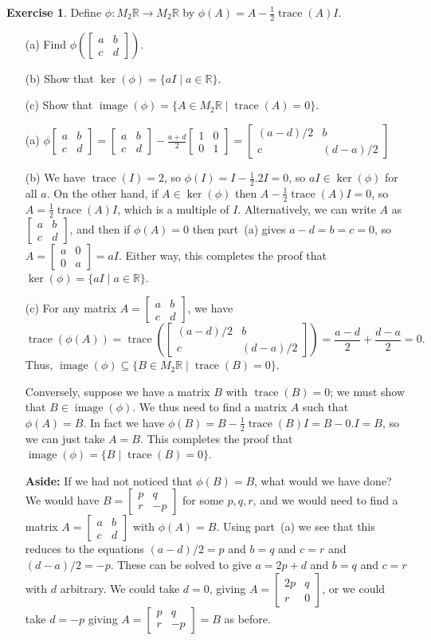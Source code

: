 \documentclass{amsart}
\newcommand{\R}         {{\mathbb{R}}}
\newcommand{\trc}       {\operatorname{trace}}
\newcommand{\img}       {\operatorname{image}}
\newcommand{\bsm}       {\left[\begin{smallmatrix}}
\newcommand{\esm}       {\end{smallmatrix}\right]}
\newcommand{\sse}       {\subseteq}
\newcommand{\st}        {\;|\;}
\newcommand{\half}      {{\textstyle\frac{1}{2}}}
\renewcommand{\:}       {\colon}
\theoremstyle{definition}
\newtheorem{exercise}{Exercise}[section]
\renewenvironment{solution}{\SolutionAtEnd}{\endSolutionAtEnd}
\begin{document}
\begin{exercise}
 Define $\phi\:M_2\R\to M_2\R$ by
 $\phi(A)=A-\half\trc(A)I$.  
 \begin{itemize}
  \item[(a)] Find $\phi\left(\bsm a&b\\ c&d\esm\right)$.
  \item[(b)] Show that $\ker(\phi)=\{aI\st a\in\R\}$.
  \item[(c)] Show that $\img(\phi)=\{A\in M_2\R\st\trc(A)=0\}$.
 \end{itemize}
\end{exercise}
\begin{solution}
 \begin{itemize}
  \item[(a)] $\displaystyle 
   \phi\bsm a&b\\ c&d\esm = 
   \bsm a&b\\ c&d\esm - \frac{a+d}{2}\bsm 1&0\\0&1\esm =
   \bsm (a-d)/2 & b \\ c & (d-a)/2 \esm
   $
  \item[(b)] We have $\trc(I)=2$, so
   $\phi(I)=I-\half.2I=0$, so $aI\in\ker(\phi)$ for all
   $a$.  On the other hand, if $A\in\ker(\phi)$ then
   $A-\half\trc(A)I=0$, so $A=\half\trc(A)I$, which is a
   multiple of $I$.  Alternatively, we can write $A$ as
   $\bsm a&b\\ c&d\esm$, and then if $\phi(A)=0$ then
   part~(a) gives $a-d=b=c=0$, so $A=\bsm a&0\\0&a\esm=aI$.
   Either way, this completes the proof that
   $\ker(\phi)=\{aI\st a\in\R\}$.
  \item[(c)] For any matrix $A=\bsm a&b\\ c&d\esm$, we have
   \[ \trc(\phi(A)) = 
       \trc\left(\bsm (a-d)/2 & b \\ c & (d-a)/2 \esm\right) =
       \frac{a-d}{2} + \frac{d-a}{2} = 0.
   \]
   Thus, $\img(\phi)\sse\{B\in M_2\R\st\trc(B)=0\}$.

   Conversely, suppose we have a matrix $B$ with
   $\trc(B)=0$; we must show that $B\in\img(\phi)$.  We
   thus need to find a matrix $A$ such that $\phi(A)=B$.  In
   fact we have $\phi(B)=B-\half\trc(B)I=B-0.I=B$, so we
   can just take $A=B$.  This completes the proof that
   $\img(\phi)=\{B\st\trc(B)=0\}$. 

   \textbf{Aside:} If we had not noticed that $\phi(B)=B$, what would
   we have done?  We would have $B=\bsm p&q\\ r&-p\esm$ for some
   $p,q,r$, and we would need to find a matrix $A=\bsm a&b\\c&d\esm$
   with $\phi(A)=B$.  Using part~(a) we see that this reduces to the
   equations $(a-d)/2=p$ and $b=q$ and $c=r$ and $(d-a)/2=-p$.  These
   can be solved to give $a=2p+d$ and $b=q$ and $c=r$ with $d$
   arbitrary.  We could take $d=0$, giving $A=\bsm 2p&q\\r&0\esm$, or
   we could take $d=-p$ giving $A=\bsm p&q\\r&-p\esm=B$ as before.
 \end{itemize}
\end{solution}
\end{document}

